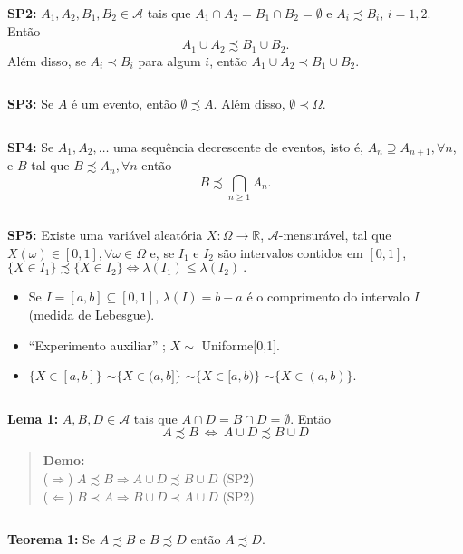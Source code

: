 \documentclass[
]{book}
\begin{document}
\(~\)

\textbf{SP2:} \(A_1, A_2, B_1, B_2 \in \mathcal{A}\) tais que \(A_1 \cap A_2 = B_1 \cap B_2 = \emptyset\) e \(A_i \precsim B_i\), \(i=1,2\). Então
\[A_1 \cup A_2 \precsim B_1 \cup B_2 .\]
Além disso, se \(A_i \prec B_i\) para algum \(i\), então \(A_1 \cup A_2 \prec B_1 \cup B_2 .\)

\(~\)

\textbf{SP3:} Se \(A\) é um evento, então \(\emptyset \precsim A\). Além disso, \(\emptyset \prec \Omega\).

\(~\)

\textbf{SP4:} Se \(A_1, A_2, \ldots\) uma sequência decrescente de eventos, isto é, \(A_n \supseteq A_{n+1}, \forall n\), e \(B\) tal que \(B \precsim A_n, \forall n\) então \[B \precsim \bigcap_{n \geq 1} A_n.\]

\(~\)

\textbf{SP5:} Existe uma variável aleatória \(X: \Omega \longrightarrow \mathbb{R}\), \(\mathcal{A}\)-mensurável, tal que \(X(\omega) \in [0,1], \forall \omega \in \Omega\) e, se \(I_1\) e \(I_2\) são intervalos contidos em \([0,1]\), \(\{X \in I_1\} \precsim \{X \in I_2\} \Leftrightarrow \lambda(I_1) \leq \lambda(I_2)~.\)

\begin{itemize}
\item
  Se \(I=[a,b] \subseteq [0,1]\), \(\lambda(I) = b-a\) é o comprimento do intervalo \(I\) (medida de Lebesgue).
\item
  ``Experimento auxiliar'' ; \(X \sim\) Uniforme{[}0,1{]}.
\item
  \(\{X \in [a,b]\}\) \(\sim \{X \in (a,b]\}\) \(\sim \{X \in [a,b)\}\) \(\sim \{X \in (a,b)\}\).
\end{itemize}

\(~\)

\textbf{Lema 1:} \(A, B, D \in \mathcal{A}\) tais que \(A \cap D = B \cap D = \emptyset\). Então \[A \precsim B ~\Leftrightarrow~ A \cup D \precsim B \cup D\]

\begin{quote}
\textbf{Demo:}\\
(\(\Rightarrow\)) \(A \precsim B \Rightarrow A \cup D \precsim B \cup D\) (SP2)\\
(\(\Leftarrow\)) \(B \prec A \Rightarrow B \cup D \prec A \cup D\) (SP2)
\end{quote}

\(~\)

\textbf{Teorema 1:} Se \(A \precsim B\) e \(B \precsim D\) então \(A \precsim D\).
\end{document}
